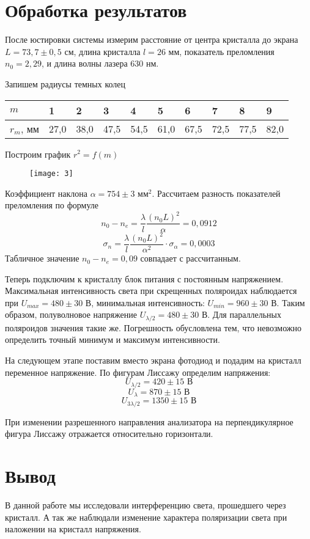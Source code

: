 	\section{Обработка результатов}
	После юстировки системы измерим расстояние от центра кристалла до экрана $L = 73,7\pm0,5$ см, длина кристалла $l = 26$ мм, показатель преломления $n_0 = 2,29$, и длина волны лазера $630$ нм.
	
	Запишем радиусы темных колец
	\begin{table}[H]
		\centering
		\begin{tabular}{|l|l|l|l|l|l|l|l|l|l|}
			\hline
			$m$       & 1    & 2    & 3    & 4    & 5    & 6    & 7    & 8    & 9    \\ \hline
			$r_m$, мм & 27,0 & 38,0 & 47,5 & 54,5 & 61,0 & 67,5 & 72,5 & 77,5 & 82,0 \\ \hline
		\end{tabular}
	\end{table}

	Построим график $r^2 = f(m)$
	\begin{figure}[H]
		\begin{center}
			\texttt{[image: 3]}
		\end{center}
	\end{figure}
	Коэффициент наклона $\alpha = 754\pm3$ мм$^2$. Рассчитаем разность показателей преломления по формуле
	\[
		n_0 - n_e = \frac{\lambda}{l}\frac{(n_0L)^2}{\alpha} = 0,0912
	\]
	\[
	\sigma_n = \frac{\lambda}{l}\frac{(n_0L)^2}{\alpha^2}\cdot\sigma_\alpha = 0,0003
	\]
	Табличное значение $n_0 - n_e = 0,09$ совпадает с рассчитанным.
	
	Теперь подключим к кристаллу блок питания с постоянным напряжением. Максимальная интенсивность света при скрещенных поляроидах наблюдается при $U_{max} = 480\pm30$ В, минимальная интенсивность: $U_{min} = 960\pm30$ В. Таким образом, полуволновое напряжение $U_{\lambda/2} = 480 \pm 30$ В. Для параллельных поляроидов значения такие же. Погрешность обусловлена тем, что невозможно определить точный минимум и максимум интенсивности.
	
	На следующем этапе поставим вместо экрана фотодиод и подадим на кристалл переменное напряжение. По фигурам Лиссажу определим напряжения:
	\[
		U_{\lambda/2} = 420 \pm 15 \text{ В}
	\]
	\[
		U_{\lambda} = 870 \pm 15\text{ В}
	\]
	\[
		U_{3\lambda/2} = 1350 \pm 15\text{ В}
	\]
	
	При изменении разрешенного направления анализатора на перпендикулярное фигура Лиссажу отражается относительно горизонтали.
	
	\section{Вывод}
	В данной работе мы исследовали интерференцию света, прошедшего через кристалл. А так же наблюдали изменение характера поляризации света при наложении на кристалл напряжения.









	

	
	
	
	
	
	
	
	
	
	
	
	
	
	
	
	
	

